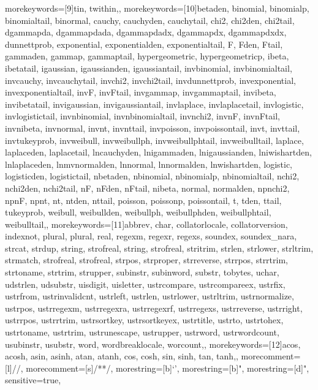 {{    %
    morekeywords=[9]{tin, twithin,},
    morekeywords=[10]{betaden, binomial, binomialp, binomialtail, binormal, cauchy, cauchyden, cauchytail, chi2, chi2den, chi2tail, dgammapda, dgammapdada, dgammapdadx, dgammapdx, dgammapdxdx, dunnettprob, exponential, exponentialden, exponentialtail, F, Fden, Ftail, gammaden, gammap, gammaptail, hypergeometric, hypergeometricp, ibeta, ibetatail, igaussian, igaussianden, igaussiantail, invbinomial, invbinomialtail, invcauchy, invcauchytail, invchi2, invchi2tail, invdunnettprob, invexponential, invexponentialtail, invF, invFtail, invgammap, invgammaptail, invibeta, invibetatail, invigaussian, invigaussiantail, invlaplace, invlaplacetail, invlogistic, invlogistictail, invnbinomial, invnbinomialtail, invnchi2, invnF, invnFtail, invnibeta, invnormal, invnt, invnttail, invpoisson, invpoissontail, invt, invttail, invtukeyprob, invweibull, invweibullph, invweibullphtail, invweibulltail, laplace, laplaceden, laplacetail, lncauchyden, lnigammaden, lnigaussianden, lniwishartden, lnlaplaceden, lnmvnormalden, lnnormal, lnnormalden, lnwishartden, logistic, logisticden, logistictail, nbetaden, nbinomial, nbinomialp, nbinomialtail, nchi2, nchi2den, nchi2tail, nF, nFden, nFtail, nibeta, normal, normalden, npnchi2, npnF, npnt, nt, ntden, nttail, poisson, poissonp, poissontail, t, tden, ttail, tukeyprob, weibull, weibullden, weibullph, weibullphden, weibullphtail, weibulltail,},
    morekeywords=[11]{abbrev, char, collatorlocale, collatorversion, indexnot, plural, plural, real, regexm, regexr, regexs, soundex, soundex_nara, strcat, strdup, string, strofreal, string, strofreal, stritrim, strlen, strlower, strltrim, strmatch, strofreal, strofreal, strpos, strproper, strreverse, strrpos, strrtrim, strtoname, strtrim, strupper, subinstr, subinword, substr, tobytes, uchar, udstrlen, udsubstr, uisdigit, uisletter, ustrcompare, ustrcompareex, ustrfix, ustrfrom, ustrinvalidcnt, ustrleft, ustrlen, ustrlower, ustrltrim, ustrnormalize, ustrpos, ustrregexm, ustrregexra, ustrregexrf, ustrregexs, ustrreverse, ustrright, ustrrpos, ustrrtrim, ustrsortkey, ustrsortkeyex, ustrtitle, ustrto, ustrtohex, ustrtoname, ustrtrim, ustrunescape, ustrupper, ustrword, ustrwordcount, usubinstr, usubstr, word, wordbreaklocale, worcount,},
    morekeywords=[12]{acos, acosh, asin, asinh, atan, atanh, cos, cosh, sin, sinh, tan, tanh,},
    morecomment=[l]{//},
    morecomment=[s]{/*}{*/},
    morestring=[b]{`}{'},
    morestring=[b]",
    morestring=[d]",
    sensitive=true,
}

\renewcommand{\lstlistingname}{STATA Code}
}

{
\newcommand\reallywidehat[1]{%
\savestack{\tmpbox}{\stretchto{%
  \scaleto{%
    \scalerel*[\widthof{\ensuremath{#1}}]{\kern-.6pt\bigwedge\kern-.6pt}%
    {\rule[-\textheight/2]{1ex}{\textheight}}%
  }{\textheight}%
}{0.5ex}}%
\stackon[1pt]{#1}{\tmpbox}%
}}